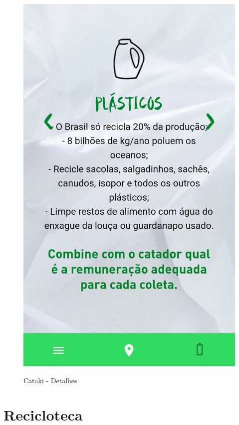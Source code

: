 \documentclass[
	12pt,				%
	openright,			%
	twoside,			%
	a4paper,			%
	english,			%
	french,				%
	spanish,			%
	brazil				%
	]{abntex2}
\begin{document}
\begin{figure}[htb]
\begin{minipage}{0.45\textwidth}
     \label{fig:figura3}
  \end{minipage}
  \hfill
  \begin{minipage}{0.45\textwidth}
    \centering
    \caption{Cataki - Detalhes}
    \includegraphics[scale=0.15]{media/catakimateriaisdetalhes.jpg}
     \label{fig:figura4}
  \end{minipage}
\end{figure}

\section{Recicloteca}
\end{document}
